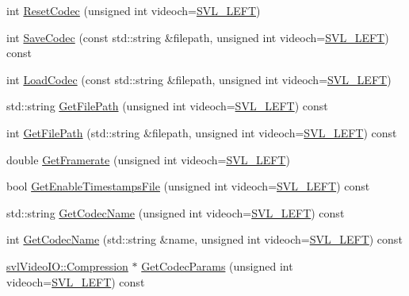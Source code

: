 \begin{DoxyCompactItemize}
\item 
int \hyperlink{classsvl_filter_video_file_writer_a3417a15e495c2e310958d890934387f7}{Reset\+Codec} (unsigned int videoch=\hyperlink{svl_definitions_8h_ab9fec7615f19c8df2919eebcab0b187f}{S\+V\+L\+\_\+\+L\+E\+F\+T})
\item 
int \hyperlink{classsvl_filter_video_file_writer_a67fa9162d568f51bfd054f73ee5992ca}{Save\+Codec} (const std\+::string \&filepath, unsigned int videoch=\hyperlink{svl_definitions_8h_ab9fec7615f19c8df2919eebcab0b187f}{S\+V\+L\+\_\+\+L\+E\+F\+T}) const 
\item 
int \hyperlink{classsvl_filter_video_file_writer_a183e557f3e6bea9277aacfc94f6a6ab1}{Load\+Codec} (const std\+::string \&filepath, unsigned int videoch=\hyperlink{svl_definitions_8h_ab9fec7615f19c8df2919eebcab0b187f}{S\+V\+L\+\_\+\+L\+E\+F\+T})
\item 
std\+::string \hyperlink{classsvl_filter_video_file_writer_aa591d6ed578c2ae26d3936fbf2b7e367}{Get\+File\+Path} (unsigned int videoch=\hyperlink{svl_definitions_8h_ab9fec7615f19c8df2919eebcab0b187f}{S\+V\+L\+\_\+\+L\+E\+F\+T}) const 
\item 
int \hyperlink{classsvl_filter_video_file_writer_a7f698e48c88029d4d5f43b4031f86c0e}{Get\+File\+Path} (std\+::string \&filepath, unsigned int videoch=\hyperlink{svl_definitions_8h_ab9fec7615f19c8df2919eebcab0b187f}{S\+V\+L\+\_\+\+L\+E\+F\+T}) const 
\item 
double \hyperlink{classsvl_filter_video_file_writer_a4787b41c72347539198e108a8b530193}{Get\+Framerate} (unsigned int videoch=\hyperlink{svl_definitions_8h_ab9fec7615f19c8df2919eebcab0b187f}{S\+V\+L\+\_\+\+L\+E\+F\+T})
\item 
bool \hyperlink{classsvl_filter_video_file_writer_a3a218b8f50e9cf3724bcf5ef69e7ba87}{Get\+Enable\+Timestamps\+File} (unsigned int videoch=\hyperlink{svl_definitions_8h_ab9fec7615f19c8df2919eebcab0b187f}{S\+V\+L\+\_\+\+L\+E\+F\+T}) const 
\item 
std\+::string \hyperlink{classsvl_filter_video_file_writer_aacd6d0d3f9e954c36c8fa602f8b2943a}{Get\+Codec\+Name} (unsigned int videoch=\hyperlink{svl_definitions_8h_ab9fec7615f19c8df2919eebcab0b187f}{S\+V\+L\+\_\+\+L\+E\+F\+T}) const 
\item 
int \hyperlink{classsvl_filter_video_file_writer_a58d9bdc74af5dfd7193d1d2274088c43}{Get\+Codec\+Name} (std\+::string \&name, unsigned int videoch=\hyperlink{svl_definitions_8h_ab9fec7615f19c8df2919eebcab0b187f}{S\+V\+L\+\_\+\+L\+E\+F\+T}) const 
\item 
\hyperlink{classsvl_video_i_o_a932d071ec9be4fefde824ab9b9125282}{svl\+Video\+I\+O\+::\+Compression} $\ast$ \hyperlink{classsvl_filter_video_file_writer_a10ea20d92306462e446bf25fdb7db416}{Get\+Codec\+Params} (unsigned int videoch=\hyperlink{svl_definitions_8h_ab9fec7615f19c8df2919eebcab0b187f}{S\+V\+L\+\_\+\+L\+E\+F\+T}) const 

\end{DoxyCompactItemize}
